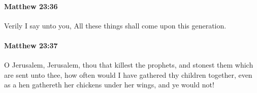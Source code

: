 		\paragraph{Matthew 23:36} %
			\label{MATTHEW-23-36}

			Verily I say unto you, All these things shall come upon this generation.

			\begin{framed}
			\scriptsize
				\begin{compactdesc}
					\item[SBLG] 
				\end{compactdesc}
			\end{framed}

		\paragraph{Matthew 23:37} %
			\label{MATTHEW-23-37}

			O Jerusalem, Jerusalem, thou that killest the prophets, and stonest them which are sent unto thee, how often would I have gathered thy children together, even as a hen gathereth her chickens under her wings, and ye would not!

